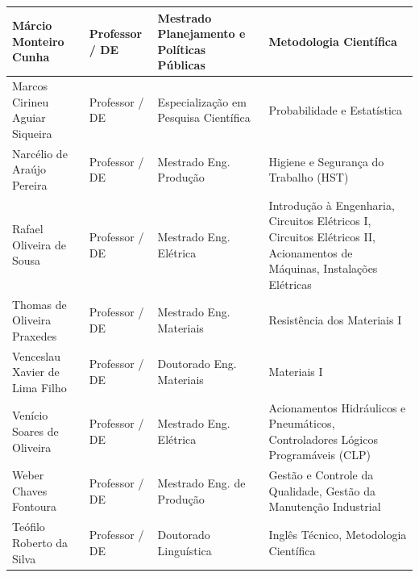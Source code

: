 \documentclass{paper}
\begin{document}
\begin{longtable}{|p{3.0cm}|p{2.5cm}|p{2.0cm}|p{6.3cm}|}
    Márcio Monteiro Cunha & Professor / DE  &  Mestrado Planejamento e Políticas Públicas  &  Metodologia Científica  \\ \hline
    Marcos Cirineu Aguiar Siqueira & Professor / DE  &  Especialização em Pesquisa Científica  &  Probabilidade e Estatística  \\ \hline
    Narcélio de Araújo Pereira & Professor / DE  &  Mestrado Eng. Produção  &  Higiene e Segurança do Trabalho (HST)  \\ \hline
    Rafael Oliveira de Sousa  &  Professor / DE &  Mestrado Eng. Elétrica  &  Introdução à Engenharia, Circuitos Elétricos I, Circuitos Elétricos II, Acionamentos de Máquinas, Instalações Elétricas   \\ \hline
    Thomas de Oliveira Praxedes  &  Professor / DE &  Mestrado Eng. Materiais  &  Resistência dos Materiais I   \\ \hline
    Venceslau Xavier de Lima Filho  &  Professor / DE &  Doutorado Eng. Materiais  &  Materiais I   \\ \hline
    Venício Soares de Oliveira  &  Professor / DE &  Mestrado Eng. Elétrica  &  Acionamentos Hidráulicos e Pneumáticos, Controladores Lógicos Programáveis (CLP)   \\ \hline
    Weber Chaves Fontoura  &  Professor / DE &  Mestrado Eng. de Produção  & Gestão e Controle da Qualidade, Gestão da Manutenção Industrial \\ \hline
    Teófilo Roberto da Silva & Professor / DE  &  Doutorado Linguística &  Inglês Técnico, Metodologia Científica \\ \hline
   \end{longtable}
\else
\end{document}

